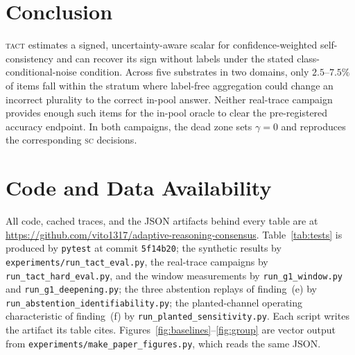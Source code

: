 \documentclass{article}
\newcommand{\SC}{\textsc{sc}}
\newcommand{\TACT}{\textsc{tact}}
\begin{document}
\section{Conclusion}
\TACT{} estimates a signed, uncertainty-aware scalar for confidence-weighted
self-consistency and can recover its sign without labels under the stated
class-conditional-noise condition. Across five substrates in two domains, only
$2.5$--$7.5\%$ of items fall within the stratum where label-free aggregation
could change an incorrect plurality to the correct in-pool answer. Neither
real-trace campaign provides enough such items for the in-pool oracle to clear
the pre-registered accuracy endpoint. In both campaigns, the dead zone sets
$\gamma=0$ and reproduces the corresponding \SC{} decisions.

\section*{Code and Data Availability}
All code, cached traces, and the JSON artifacts behind every table are at
\url{https://github.com/vito1317/adaptive-reasoning-consensus}. Table~\ref{tab:tests}
is produced by \texttt{pytest} at commit \texttt{5f14b20}; the synthetic results by
\texttt{experiments/run\_tact\_eval.py}, the real-trace campaigns by
\texttt{run\_tact\_hard\_eval.py}, and the window measurements by
\texttt{run\_g1\_window.py} and \texttt{run\_g1\_deepening.py}; the three
abstention replays of finding~(e) by \texttt{run\_abstention\_identifiability.py};
the planted-channel operating characteristic of finding~(f) by
\texttt{run\_planted\_sensitivity.py}.
Each script
writes the artifact its table cites. Figures~\ref{fig:baselines}--\ref{fig:group}
are vector output from \texttt{experiments/make\_paper\_figures.py}, which reads
the same JSON.

\appendix
\end{document}
